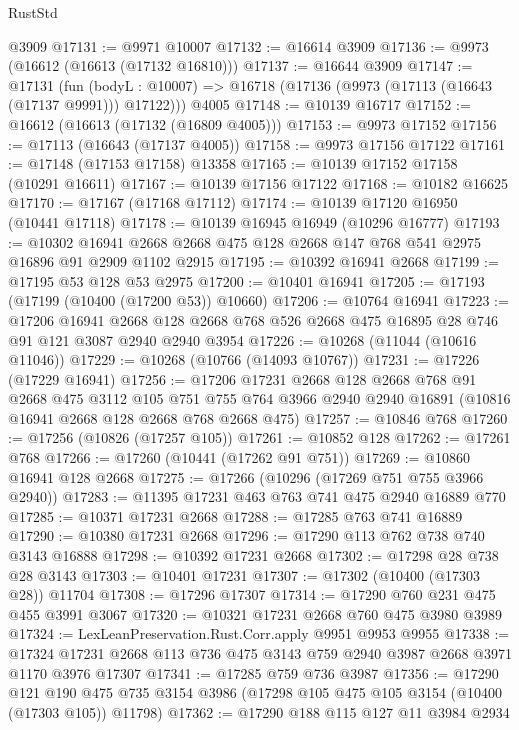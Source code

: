 \begin{lexlean}{RustStd}
\begin{coremodule}
    @3909
@17131 := @9971 @10007
@17132 := @16614 @3909
@17136 := @9973 (@16612 (@16613 (@17132 @16810)))
@17137 := @16644 @3909
@17147 := @17131
    (fun (bodyL : @10007) => @16718 (@17136 (@9973 (@17113 (@16643 (@17137 @9991))) @17122)))
    @4005
@17148 := @10139 @16717
@17152 := @16612 (@16613 (@17132 (@16809 @4005)))
@17153 := @9973 @17152
@17156 := @17113 (@16643 (@17137 @4005))
@17158 := @9973 @17156 @17122
@17161 := @17148 (@17153 @17158) @13358
@17165 := @10139 @17152 @17158 (@10291 @16611)
@17167 := @10139 @17156 @17122
@17168 := @10182 @16625
@17170 := @17167 (@17168 @17112)
@17174 := @10139 @17120 @16950 (@10441 @17118)
@17178 := @10139 @16945 @16949 (@10296 @16777)
@17193 := @10302
    @16941
    @2668
    @2668
    @475
    @128
    @2668
    @147
    @768
    @541
    @2975
    @16896
    @91
    @2909
    @1102
    @2915
@17195 := @10392 @16941 @2668
@17199 := @17195 @53 @128 @53 @2975
@17200 := @10401 @16941
@17205 := @17193 (@17199 (@10400 (@17200 @53)) @10660)
@17206 := @10764 @16941
@17223 := @17206
    @16941
    @2668
    @128
    @2668
    @768
    @526
    @2668
    @475
    @16895
    @28
    @746
    @91
    @121
    @3087
    @2940
    @2940
    @3954
@17226 := @10268 (@11044 (@10616 @11046))
@17229 := @10268 (@10766 (@14093 @10767))
@17231 := @17226 (@17229 @16941)
@17256 := @17206
    @17231
    @2668
    @128
    @2668
    @768
    @91
    @2668
    @475
    @3112
    @105
    @751
    @755
    @764
    @3966
    @2940
    @2940
    @16891
    (@10816 @16941 @2668 @128 @2668 @768 @2668 @475)
@17257 := @10846 @768
@17260 := @17256 (@10826 (@17257 @105))
@17261 := @10852 @128
@17262 := @17261 @768
@17266 := @17260 (@10441 (@17262 @91 @751))
@17269 := @10860 @16941 @128 @2668
@17275 := @17266 (@10296 (@17269 @751 @755 @3966 @2940))
@17283 := @11395 @17231 @463 @763 @741 @475 @2940 @16889 @770
@17285 := @10371 @17231 @2668
@17288 := @17285 @763 @741 @16889
@17290 := @10380 @17231 @2668
@17296 := @17290 @113 @762 @738 @740 @3143 @16888
@17298 := @10392 @17231 @2668
@17302 := @17298 @28 @738 @28 @3143
@17303 := @10401 @17231
@17307 := @17302 (@10400 (@17303 @28)) @11704
@17308 := @17296 @17307
@17314 := @17290 @760 @231 @475 @455 @3991 @3067
@17320 := @10321 @17231 @2668 @760 @475 @3980 @3989
@17324 := LexLeanPreservation.Rust.Corr.apply @9951 @9953 @9955
@17338 := @17324 @17231 @2668 @113 @736 @475 @3143 @759 @2940 @3987 @2668 @3971 @1170 @3976 @17307
@17341 := @17285 @759 @736 @3987
@17356 := @17290
    @121
    @190
    @475
    @735
    @3154
    @3986
    (@17298 @105 @475 @105 @3154 (@10400 (@17303 @105)) @11798)
@17362 := @17290 @188 @115 @127 @11 @3984 @2934

\end{coremodule}
\end{lexlean}
